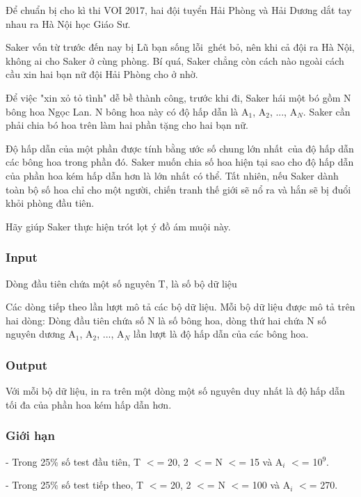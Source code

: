 

Để chuẩn bị cho kì thi VOI 2017, hai đội tuyển Hải Phòng và Hải Dương dắt tay nhau ra Hà Nội học Giáo Sư.

Saker vốn từ trước đến nay bị Lũ bạn sống lỗi ghét bỏ, nên khi cả đội ra Hà Nội, không ai cho Saker ở cùng phòng. Bí quá, Saker chẳng còn cách nào ngoài cách cầu xin hai bạn nữ đội Hải Phòng cho ở nhờ.

Để việc "xin xỏ tỏ tình" dễ bề thành công, trước khi đi, Saker hái một bó gồm N bông hoa Ngọc Lan. N bông hoa này có độ hấp dẫn là A$_1$, A$_2$, ..., A$_N$. Saker cần phải chia bó hoa trên làm hai phần tặng cho hai bạn nữ.

Độ hấp dẫn của một phần được tính bằng ước số chung lớn nhất của độ hấp dẫn các bông hoa trong phần đó. Saker muốn chia số hoa hiện tại sao cho độ hấp dẫn của phần hoa kém hấp dẫn hơn là lớn nhất có thể. Tất nhiên, nếu Saker dành toàn bộ số hoa chỉ cho một người, chiến tranh thế giới sẽ nổ ra và hắn sẽ bị đuổi khỏi phòng đầu tiên.

Hãy giúp Saker thực hiện trót lọt ý đồ ám muội này.

\subsubsection{Input}

Dòng đầu tiên chứa một số nguyên T, là số bộ dữ liệu

Các dòng tiếp theo lần lượt mô tả các bộ dữ liệu. Mỗi bộ dữ liệu được mô tả trên hai dòng: Dòng đầu tiên chứa số N là số bông hoa, dòng thứ hai chứa N số nguyên dương A$_1$, A$_2$, ..., A$_N$ lần lượt là độ hấp dẫn của các bông hoa.

\subsubsection{Output}

Với mỗi bộ dữ liệu, in ra trên một dòng một số nguyên duy nhất là độ hấp dẫn tối đa của phần hoa kém hấp dẫn hơn.

\subsubsection{Giới hạn}

- Trong 25\% số test đầu tiên, T $<$= 20, 2 $<$= N $<$= 15 và A$_i$ $<$= 10$^9$.

- Trong 25\% số test tiếp theo, T $<$= 20, 2 $<$= N $<$= 100 và A$_i$ $<$= 270.

